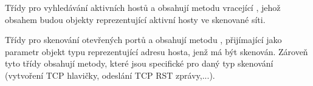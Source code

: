 \documentclass[../projekt.tex]{subfiles}
\begin{document}
Třídy pro vyhledávání aktivních hostů  a  obsahují metodu  vracející , jehož obsahem budou objekty  reprezentující aktivní hosty ve skenované síti.

Třídy pro skenování otevřených portů  a  obsahují metodu , přijímající jako parametr objekt typu  reprezentující adresu hosta, jenž má být skenován. Zároveň tyto třídy obsahují metody, které jsou specifické pro daný typ skenování (vytvoření TCP hlavičky, odeslání TCP RST zprávy,...).
\end{document}
